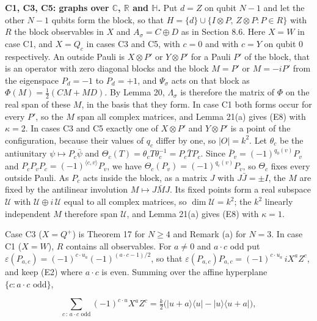 \documentclass[11pt,a4paper]{article}
\begin{document}
\textbf{C1, C3, C5: graphs over \(\mathbb C\), \(\mathbb R\) and \(\mathbb H\).} Put \(d=Z\) on qubit \(N-1\) and let the other
\(N-1\) qubits form the block, so that \(H=\{d\}\cup\{I\otimes P,\,Z\otimes P:P\in R\}\) with \(R\) the block
observables in \(X\) and \(A_\sigma=C\oplus D\) as in Section 8.6. Here \(X=W\) in case C1, and \(X=Q_c\) in cases
C3 and C5, with \(c=0\) and with \(c=Y\) on qubit 0 respectively. An outside Pauli is \(X\otimes P'\) or
\(Y\otimes P'\) for a Pauli \(P'\) of the block, that is an operator with zero diagonal blocks and the block
\(M=P'\) or \(M=-iP'\) from the eigenspace \(P_d=-1\) to \(P_d=+1\), and \(\Psi_\sigma\) acts on that block as
\(\Phi(M)=\frac12(CM+MD)\). By Lemma 20, \(\Lambda_\sigma\) is therefore
the matrix of \(\Phi\) on the real span of these \(M\), in the basis that they form. In case C1 both forms
occur for every \(P'\), so the \(M\) span all complex matrices, and Lemma 21(a) gives (E8) with \(\kappa=2\). In
cases C3 and C5 exactly one of \(X\otimes P'\) and \(Y\otimes P'\) is a point of the configuration, because their values of \(q_c\)
differ by one, so \(|O|=k^2\). Let \(\theta_c\) be the antiunitary \(\psi\mapsto P_c\bar\psi\) and
\(\Theta_c(T)=\theta_cT\theta_c^{-1}=P_c\bar TP_c\). Since \(\bar P_v=(-1)^{q_0(v)}P_v\) and
\(P_cP_vP_c=(-1)^{\langle c,v\rangle}P_v\), we have \(\Theta_c(P_v)=(-1)^{q_c(v)}P_v\), so \(\Theta_c\) fixes every
outside Pauli. As \(P_c\) acts inside the block, as a matrix \(J\) with \(J\bar J=\pm I\), the \(M\) are fixed by the
antilinear involution \(M\mapsto J\bar MJ\). Its fixed points form a real subspace \(\mathcal U\) with
\(\mathcal U\oplus i\,\mathcal U\) equal to all complex matrices, so \(\dim\mathcal U=k^2\); the \(k^2\) linearly
independent \(M\) therefore span \(\mathcal U\), and Lemma 21(a) gives (E8) with \(\kappa=1\).

Case C3 (\(X=Q^+\)) is Theorem 17 for \(N\ge4\) and Remark (a) for \(N=3\). In case C1
(\(X=W\)), \(R\) contains all observables. For \(a\neq0\) and \(a\cdot c\) odd put
\(\varepsilon(P_{a,c})=(-1)^{c\cdot u_a}(-1)^{(a\cdot c-1)/2}\), so that
\(\varepsilon(P_{a,c})P_{a,c}=(-1)^{c\cdot u_a}\,iX^aZ^c\), and keep (E2) where \(a\cdot c\) is even. Summing over the
affine hyperplane \(\{c:a\cdot c\text{ odd}\}\),

\[\sum_{c\,:\,a\cdot c\text{ odd}}(-1)^{c\cdot u}X^aZ^c=\tfrac k2\bigl(|u+a\rangle\langle u|-|u\rangle\langle u+a|\bigr),
\tag{E10}\]
\end{document}

